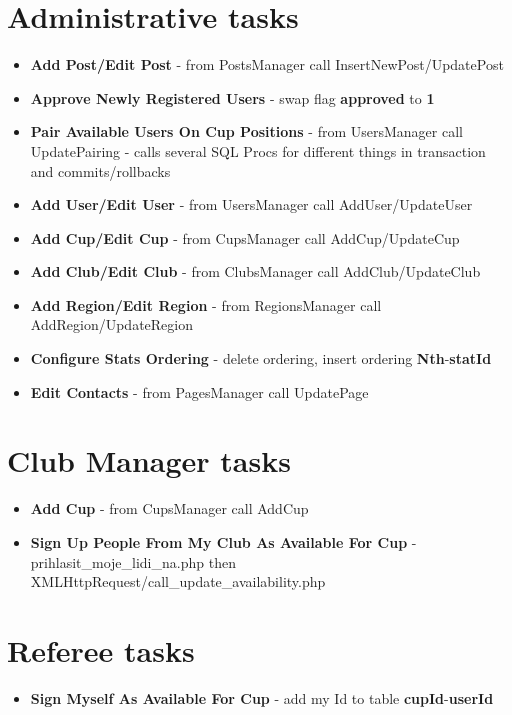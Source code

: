 \section{Administrative tasks}
\begin{itemize}
    \item \textbf{Add Post/Edit Post} - from PostsManager call \newline InsertNewPost/UpdatePost
    \item \textbf{Approve Newly Registered Users} - swap flag \textbf{approved} to \textbf{1}
    \item \textbf{Pair Available Users On Cup Positions} - from UsersManager call UpdatePairing - calls several SQL Procs for different things in transaction and commits/rollbacks
    \item \textbf{Add User/Edit User} - from UsersManager call AddUser/UpdateUser
    \item \textbf{Add Cup/Edit Cup} - from CupsManager call AddCup/UpdateCup
    \item \textbf{Add Club/Edit Club} - from ClubsManager call AddClub/UpdateClub
    \item \textbf{Add Region/Edit Region} - from RegionsManager call AddRegion/UpdateRegion
    \item \textbf{Configure Stats Ordering} - delete ordering, insert ordering \textbf{Nth}-\textbf{statId} 
    \item \textbf{Edit Contacts} - from PagesManager call UpdatePage
\end{itemize} 
\section{Club Manager tasks}
\begin{itemize}
    \item \textbf{Add Cup} - from CupsManager call AddCup
    \item \textbf{Sign Up People From My Club As Available For Cup} - prihlasit\_moje\_lidi\_na.php then XMLHttpRequest/call\_update\_availability.php
\end{itemize}   
\section{Referee tasks}    
\begin{itemize}
    \item \textbf{Sign Myself As Available For Cup} - add my Id to table \textbf{cupId}-\textbf{userId}
\end{itemize}
\fi
